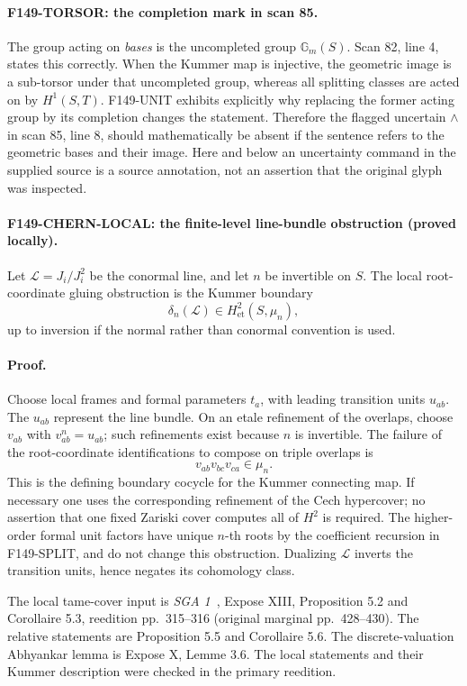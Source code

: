 \documentclass[11pt,a4paper]{article}
\theoremstyle{definition}
\begin{document}
\paragraph{F149-TORSOR: the completion mark in scan 85.}
The group acting on \emph{bases} is the uncompleted group
\(\mathbb G_m(S)\).  Scan 82, line 4, states this correctly.  When the
Kummer map is injective, the geometric image is a sub-torsor under
that uncompleted group, whereas all splitting classes are acted on by
\(H^1(S,T)\).  F149-UNIT exhibits explicitly why replacing the former
acting group by its completion changes the statement.  Therefore the
flagged uncertain \(\wedge\) in scan 85, line 8, should mathematically
be absent if the sentence refers to the geometric bases and their
image.  Here and below an uncertainty command in the supplied source
is a source annotation, not an assertion that the original glyph was
inspected.

\paragraph{F149-CHERN-LOCAL: the finite-level line-bundle obstruction
(proved locally).}
Let \(\mathcal L=J_i/J_i^2\) be the conormal line, and let \(n\) be
invertible on \(S\).  The local root-coordinate gluing obstruction is
the Kummer boundary
\[
 \delta_n(\mathcal L)\in H^2_{\mathrm{et}}(S,\mu_n),
\]
up to inversion if the normal rather than conormal convention is used.

\paragraph{Proof.}
Choose local frames and formal parameters \(t_a\), with leading
transition units \(u_{ab}\).  The \(u_{ab}\) represent the line bundle.
On an etale refinement of the overlaps, choose
\(v_{ab}\) with \(v_{ab}^n=u_{ab}\); such refinements exist because
\(n\) is invertible.  The failure of the root-coordinate identifications
to compose on triple overlaps is
\[
 v_{ab}v_{bc}v_{ca}\in\mu_n.
\]
This is the defining boundary cocycle for the Kummer connecting map.
If necessary one uses the corresponding refinement of the Cech
hypercover; no assertion that one fixed Zariski cover computes all of
\(H^2\) is required.  The higher-order formal unit factors have unique
\(n\)-th roots by the coefficient recursion in F149-SPLIT, and do not
change this obstruction.  Dualizing \(\mathcal L\) inverts the
transition units, hence negates its cohomology class.

The local tame-cover input is \emph{SGA 1}~\cite{SGA1}, Expose XIII,
Proposition 5.2 and Corollaire 5.3, reedition pp.~315--316
(original marginal pp.~428--430).  The relative statements are
Proposition 5.5 and Corollaire 5.6.  The discrete-valuation
Abhyankar lemma is Expose X, Lemme 3.6.  The local statements and
their Kummer description were checked in the primary reedition.
\end{document}
